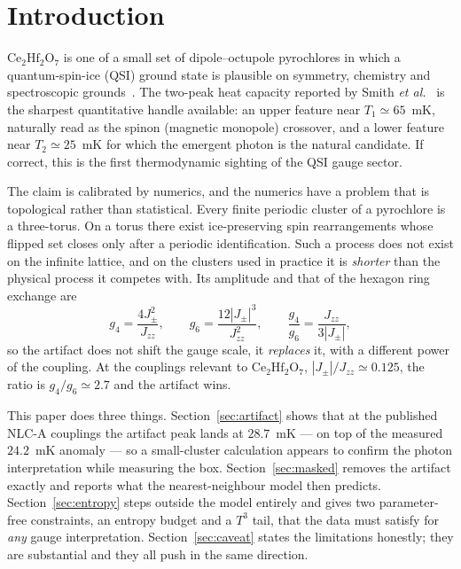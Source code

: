 \documentclass[aps,prb,preprint,amsmath,amssymb,superscriptaddress,
longbibliography,floatfix]{revtex4-2}
\newcommand{\Jzz}{J_{zz}}
\newcommand{\Jpm}{J_{\pm}}
\newcommand{\CHO}{\mathrm{Ce_2Hf_2O_7}}
\begin{document}
\maketitle

\section{Introduction}

$\CHO$ is one of a small set of dipole--octupole pyrochlores in which a
quantum-spin-ice (QSI) ground state is plausible on symmetry, chemistry and
spectroscopic grounds~\cite{HuangChenHermele2014,Gao2019,Gaudet2019,%
Bhardwaj2022,RauGingras2019}.  The two-peak heat capacity reported by Smith
\textit{et al.}~\cite{Smith2025} is the sharpest quantitative handle available:
an upper feature near $T_1\simeq65$~mK, naturally read as the spinon (magnetic
monopole) crossover, and a lower feature near $T_2\simeq25$~mK for which the
emergent photon is the natural candidate.  If correct, this is the first
thermodynamic sighting of the QSI gauge sector.

The claim is calibrated by numerics, and the numerics have a problem that is
topological rather than statistical.  Every finite periodic cluster of a
pyrochlore is a three-torus.  On a torus there exist ice-preserving spin
rearrangements whose flipped set closes only after a periodic identification.
Such a process does not exist on the infinite lattice, and on the clusters used
in practice it is \emph{shorter} than the physical process it competes with.
Its amplitude and that of the hexagon ring exchange are
\begin{equation}
 g_4=\frac{4\Jpm^2}{\Jzz},\qquad
 g_6=\frac{12|\Jpm|^3}{\Jzz^2},\qquad
 \frac{g_4}{g_6}=\frac{\Jzz}{3|\Jpm|},
 \label{eq:g4g6}
\end{equation}
so the artifact does not shift the gauge scale, it \emph{replaces} it, with a
different power of the coupling.  At the couplings relevant to $\CHO$,
$|\Jpm|/\Jzz\simeq0.125$, the ratio is $g_4/g_6\simeq2.7$ and the artifact wins.

This paper does three things.  Section~\ref{sec:artifact} shows that at the
published NLC-A couplings the artifact peak lands at $28.7$~mK --- on top of the
measured $24.2$~mK anomaly --- so a small-cluster calculation appears to confirm
the photon interpretation while measuring the box.  Section~\ref{sec:masked}
removes the artifact exactly and reports what the nearest-neighbour model then
predicts.  Section~\ref{sec:entropy} steps outside the model entirely and gives
two parameter-free constraints, an entropy budget and a $T^3$ tail, that the
data must satisfy for \emph{any} gauge interpretation.  Section~\ref{sec:caveat}
states the limitations honestly; they are substantial and they all push in the
same direction.
\end{document}
